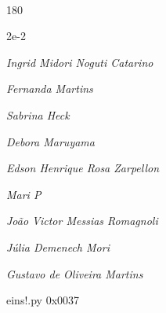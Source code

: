 \documentclass[12pt]{article}
\begin{document}
	\hfill	  	  


\pagebreak			

	\ 
	\vfill
	\begin{turn}{180}	
		\begin{minipage}{\textwidth}
		  	\ttfamily %
			\centering
			{\Huge 2e-2}
		  
			\hfill
		  
			

\textit{\small Ingrid Midori Noguti Catarino}

\textit{\small Fernanda Martins}

\textit{\small Sabrina Heck}

\textit{\small Debora Maruyama}

\textit{\small Edson Henrique Rosa Zarpellon}

\textit{\small Mari P}

\textit{\small João Victor Messias Romagnoli}

\textit{\small Júlia Demenech Mori}

\textit{\small Gustavo de Oliveira Martins}

\bigskip

eins!.py
0x0037


		\end{minipage}	
	\end{turn}
	\vfill
	\

\pagebreak
\end{document}
